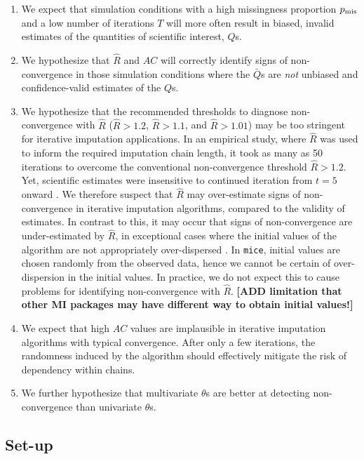 \documentclass[Royal,times,sageh]{sagej}
\begin{document}
\begin{enumerate}
\def\labelenumi{\arabic{enumi}.}
\item
  We expect that simulation conditions with a high missingness proportion \(p_{\rm mis}\) and a low number of iterations \(T\) will more often result in biased, invalid estimates of the quantities of scientific interest, \(Q\)s.
\item
  We hypothesize that \(\widehat{R}\) and \(AC\) will correctly identify signs of non-convergence in those simulation conditions where the \(\bar{Q}\)s are \emph{not} unbiased and confidence-valid estimates of the \(Q\)s.
\item
  We hypothesize that the recommended thresholds to diagnose non-convergence with \(\widehat{R}\) (\(\widehat{R} > 1.2\), \(\widehat{R} > 1.1\), and \(\widehat{R} > 1.01\)) may be too stringent for iterative imputation applications. In an empirical study, where \(\widehat{R}\) was used to inform the required imputation chain length, it took as many as 50 iterations to overcome the conventional non-convergence threshold \(\widehat{R}>1.2\). Yet, scientific estimates were insensitive to continued iteration from \(t=5\) onward \citep{lace07}. We therefore suspect that \(\widehat{R}\) may over-estimate signs of non-convergence in iterative imputation algorithms, compared to the validity of estimates. In contrast to this, it may occur that signs of non-convergence are under-estimated by \(\widehat{R}\), in exceptional cases where the initial values of the algorithm are not appropriately over-dispersed \citep[p.~437]{broo98}. In \texttt{mice}, initial values are chosen randomly from the observed data, hence we cannot be certain of over-dispersion in the initial values. In practice, we do not expect this to cause problems for identifying non-convergence with \(\widehat{R}\). \textbf{{[}ADD limitation that other MI packages may have different way to obtain initial values!{]}}
\item
  We expect that high \(AC\) values are implausible in iterative imputation algorithms with typical convergence. After only a few iterations, the randomness induced by the algorithm should effectively mitigate the risk of dependency within chains.
\item
  We further hypothesize that multivariate \(\theta\)s are better at detecting non-convergence than univariate \(\theta\)s.
\end{enumerate}

\hypertarget{set-up}{%
\subsection{Set-up}\label{set-up}}
\end{document}
